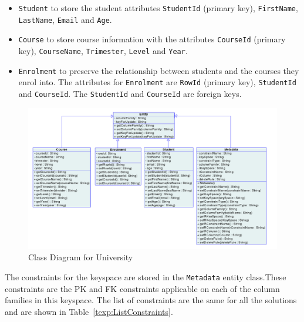 	\begin{itemize}
	  \item \texttt{Student} to store the student attributes \texttt{StudentId}
	  (primary key), \texttt{FirstName}, \texttt{LastName}, \texttt{Email} and
	  \texttt{Age}.
	  \item \texttt{Course} to store course information with the attributes
	  \texttt{CourseId} (primary key), \texttt{CourseName}, \texttt{Trimester},
	  \texttt{Level} and \texttt{Year}.
	  \item \texttt{Enrolment} to preserve the relationship between students and
	  the courses they enrol into. The attributes for \texttt{Enrolment} are
	  \texttt{RowId} (primary key), \texttt{StudentId} and \texttt{CourseId}. The
	  \texttt{StudentId} and \texttt{CourseId} are foreign keys.
	\end{itemize}
	
	\begin{figure}[h] \centering
		\includegraphics[width=1\textwidth]{./figure/Solutions/classdiagram-experimental.png}
		\caption{Class Diagram for University}\label{fexp:ClassDiagram}
	\end{figure} 

The constraints for the keyspace are stored in the \texttt{Metadata} entity
class.These constraints are the \ac{PK} and \ac{FK} constraints applicable on each of
the column families in this keyspace. The list of constraints are the same for
all the solutions  and are shown in Table~\ref{texp:ListConstraints}.


